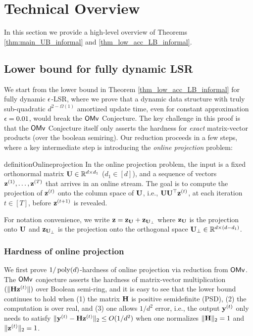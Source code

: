 \section{Technical Overview}

In this section we provide a high-level overview of Theorems \ref{thm:main_UB_informal} and \ref{thm_low_acc_LB_informal}. 

\subsection{Lower bound for fully dynamic LSR}
We start from the lower bound in Theorem \ref{thm_low_acc_LB_informal} for fully dynamic $\epsilon$-LSR, where we prove that  a dynamic data structure  with 
truly sub-quadratic $d^{2-\Omega(1)}$ amortized update time, even for constant approximation $\epsilon = 0.01$, would break the $\mathsf{OMv}$ Conjecture. The key challenge in this proof is that the $\mathsf{OMv}$ Conjecture itself only asserts the hardness for \emph{exact} matrix-vector products (over the boolean semiring). Our reduction proceeds in a few steps, where a key intermediate step is introducing the \emph{online projection} problem:


\begin{restatable}{definition}{Onlineprojection}
\label{def:online-projection} In the online projection problem, the input is a fixed orthonormal matrix $\mathbf{U} \in \mathbb{R}^{d\times d_1}$ ($d_1\in [d]$), and a sequence of vectors $\mathbf{z}^{(1)}, \ldots, \mathbf{z}^{(T)}$ that arrives in an online stream. The goal is to compute the projection of $\mathbf{z}^{(t)}$ onto the column space of $\mathbf{U}$, i.e., $\mathbf{U} \mathbf{U}^\top \mathbf{z}^{(t)}$, at each iteration $t\in [T]$, before $\mathbf{z}^{(t+1)}$ is revealed. 
\end{restatable}



For notation convenience, we write $\mathbf{z} = \mathbf{z}_{\mathbf{U}} + \mathbf{z}_{\mathbf{U}_{\perp}}$ where $\mathbf{z}_{\mathbf{U}}$ is the projection onto $\mathbf{U}$ and $\mathbf{z}_{\mathbf{U}_{\perp}}$ is the projection onto the orthogonal space $\mathbf{U}_{\perp} \in \mathbb{R}^{d\times (d-d_1) }$.

\subsubsection{Hardness of online projection}
We first prove $1/\operatorname{poly}(d)$-hardness of online projection via reduction from $\mathsf{OMv}$. The $\mathsf{OMv}$ conjecture asserts the hardness of matrix-vector multiplication $(\|\mathbf{H}\mathbf{z}^{(t)}\|)$ over Boolean semi-ring, and it is easy to see that the lower bound continues to hold when (1) the matrix $\mathbf{H}$ is positive semidefinite (PSD), (2) the computation is over real, and (3) one allows $1/d^2$ error, i.e., the output $\mathbf{y}^{(t)}$ only needs to satisfy $\|\mathbf{y}^{(t)} - \mathbf{H}\mathbf{z}^{(t)}\|_2 \leq O(1/d^2)$ when one normalizes $\|\mathbf{H}\|_2 = 1$ and $\|\mathbf{z}^{(t)}\|_2 = 1$.

